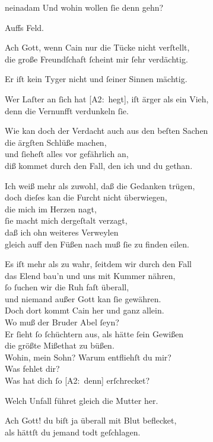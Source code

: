 \documentclass[abbrwidth=6em,tocstyle=ref-genre]{ees}
\newcommand\altlyrics[1]{[\textmd{A2}:~#1]}
\begin{document}
{\begin{movement}{neinadam}
  \voice[Adam]
  Und wohin wollen ſie denn gehn?

  \voice[Eva]
  Auffs Feld.

  \voice[Adam]
  Ach Gott, wenn Cain nur die Tücke nicht verſtellt,\\
  die große Freundſchaft ſcheint mir ſehr verdächtig.

  \voice[Eva]
  Er iſt kein Tyger nicht und ſeiner Sinnen mächtig.

  \voice[Adam]
  Wer Laſter an ſich hat \altlyrics{hegt}, iſt ärger als ein Vieh,\\
  denn die Vernunfft verdunkeln ſie.

  \voice[Eva]
  Wie kan doch der Verdacht auch aus den beſten Sachen\\
  die ärgſten Schlüße machen,\\
  und ſieheſt alles vor gefährlich an,\\
  diß kommet durch den Fall, den ich und du gethan.

  \voice[Adam]
  Ich weiß mehr als zuwohl, daß die Gedanken trügen,\\
  doch dieſes kan die Furcht nicht überwiegen,\\
  die mich im Herzen nagt,\\
  ſie macht mich dergeſtalt verzagt,\\
  daß ich ohn weiteres Verweylen\\
  gleich auff den Füßen nach muß ſie zu finden eilen.

  \voice[Eva]
  Es iſt mehr als zu wahr, ſeitdem wir durch den Fall\\
  das Elend bau’n und uns mit Kummer nähren,\\
  ſo ſuchen wir die Ruh faſt überall,\\
  und niemand außer Gott kan ſie gewähren.\\
  Doch dort kommt Cain her und ganz allein.\\
  Wo muß der Bruder Abel ſeyn?\\
  Er ſieht ſo ſchüchtern aus, als hätte ſein Gewißen\\
  die größte Mißethat zu büßen.\\
  Wohin, mein Sohn? Warum entfliehſt du mir?\\
  Was fehlet dir?\\
  Was hat dich ſo \altlyrics{denn} erſchrecket?

  \voice[Cain]
  Welch Unfall führet gleich die Mutter her.

  \voice[Eva]
  Ach Gott! du biſt ja überall mit Blut beflecket,\\
  als hättſt du jemand todt geſchlagen.


\end{movement}}
\end{document}
